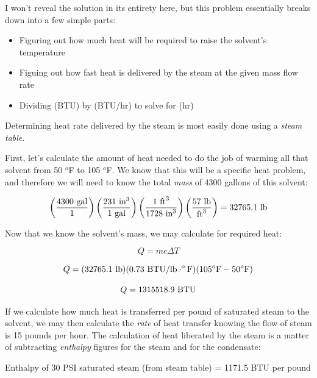 I won't reveal the solution in its entirety here, but this problem essentially breaks down into a few simple parts:

\begin{itemize}
\item{} Figuring out how much heat will be required to raise the solvent's temperature
\item{} Figuing out how fast heat is delivered by the steam at the given mass flow rate
\item{} Dividing  (BTU) by  (BTU/hr) to solve for  (hr)
\end{itemize}

Determining heat rate delivered by the steam is most easily done using a {\it steam table}.







First, let's calculate the amount of heat needed to do the job of warming all that solvent from 50 $^{o}$F to 105 $^{o}$F.  We know that this will be a specific heat problem, and therefore we will need to know the total {\it mass} of 4300 gallons of this solvent:

$$\left( {4300 \hbox{ gal} \over 1} \right)  \left({231 \hbox{ in}^3 \over 1 \hbox{ gal}} \right) \left( {1 \hbox{ ft}^3 \over 1728 \hbox{ in}^3} \right)  \left( {57 \hbox{ lb} \over \hbox{ft}^3} \right) = 32765.1 \hbox{ lb}$$

Now that we know the solvent's mass, we may calculate for required heat:

$$Q = mc \Delta T$$
 
$$Q = (32765.1 \hbox{ lb}) (0.73 \hbox{ BTU/lb}\cdot^o\hbox{F}) (105^o \hbox{F} - 50^o \hbox{F}) $$

$$Q = 1315518.9 \hbox{ BTU}$$

If we calculate how much heat is transferred per pound of saturated steam to the solvent, we may then calculate the {\it rate} of heat transfer knowing the flow of steam is 15 pounds per hour.  The calculation of heat liberated by the steam is a matter of subtracting {\it enthalpy} figures for the steam and for the condensate:

\vskip 10pt

Enthalpy of 30 PSI saturated steam (from steam table) = 1171.5 BTU per pound 

\vskip 10pt

